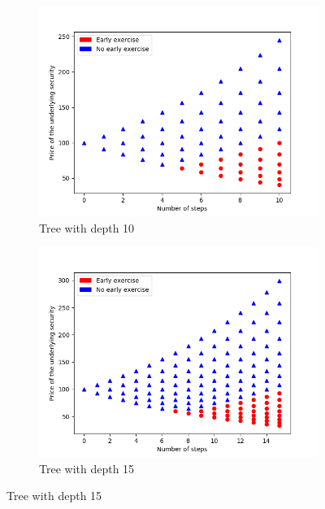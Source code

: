 \documentclass[12pt]{report}
\begin{document}
\begin{small}
	\begin{figure}[H]
		\begin{subfigure}{.5\textwidth}
			\centering
			\includegraphics[width=.8\linewidth]{plots/n_10_r_001.png}  
			\caption{Tree with depth 10}
			\label{fig2:sub-first}
		\end{subfigure}
		\begin{subfigure}{.5\textwidth}
			\centering
			\includegraphics[width=.8\linewidth]{plots/n_15_r_001.png}  
			\caption{Tree with depth 15}
			\label{fig2:sub-second}
		\end{subfigure}
		

\end{figure}
\end{small}
\end{document}
